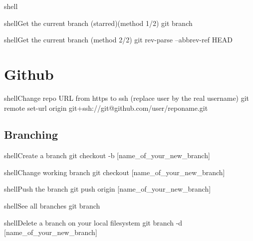 \documentclass[10pt,a4paper]{article}
\begin{document}
\begin{multicols}{3}
\begin{codebox}{shell}{}
\end{codebox}

\begin{codebox}{shell}{Get the current branch (starred)(method 1/2)}
git branch

\end{codebox}

\begin{codebox}{shell}{Get the current branch (method 2/2)}
git rev-parse --abbrev-ref HEAD

\end{codebox}

\section{Github}

\begin{codebox}{shell}{Change repo URL from https to ssh (replace user by the real username)}
git remote set-url origin git+ssh://git@github.com/user/reponame.git

\end{codebox}

\subsection{Branching}

\begin{codebox}{shell}{Create a branch}
git checkout -b [name_of_your_new_branch]

\end{codebox}

\begin{codebox}{shell}{Change working branch}
git checkout [name_of_your_new_branch]

\end{codebox}

\begin{codebox}{shell}{Push the branch}
git push origin [name_of_your_new_branch]

\end{codebox}

\begin{codebox}{shell}{See all branches}
git branch

\end{codebox}

\begin{codebox}{shell}{Delete a branch on your local filesystem}
git branch -d [name_of_your_new_branch]

\end{codebox}


\end{multicols}
\end{document}
